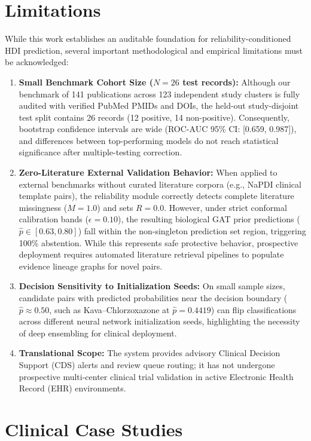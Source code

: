 \documentclass[10pt,journal,compsoc]{IEEEtran}
\begin{document}
\section{Limitations}
While this work establishes an auditable foundation for reliability-conditioned HDI prediction, several important methodological and empirical limitations must be acknowledged:
\begin{enumerate}
    \item \textbf{Small Benchmark Cohort Size ($N=26$ test records):} Although our benchmark of 141 publications across 123 independent study clusters is fully audited with verified PubMed PMIDs and DOIs, the held-out study-disjoint test split contains 26 records (12 positive, 14 non-positive). Consequently, bootstrap confidence intervals are wide (ROC-AUC 95\% CI: [0.659, 0.987]), and differences between top-performing models do not reach statistical significance after multiple-testing correction.
    \item \textbf{Zero-Literature External Validation Behavior:} When applied to external benchmarks without curated literature corpora (e.g., NaPDI clinical template pairs), the reliability module correctly detects complete literature missingness ($M = 1.0$) and sets $R = 0.0$. However, under strict conformal calibration bands ($\epsilon = 0.10$), the resulting biological GAT prior predictions ($\hat{p} \in [0.63, 0.80]$) fall within the non-singleton prediction set region, triggering 100\% abstention. While this represents safe protective behavior, prospective deployment requires automated literature retrieval pipelines to populate evidence lineage graphs for novel pairs.
    \item \textbf{Decision Sensitivity to Initialization Seeds:} On small sample sizes, candidate pairs with predicted probabilities near the decision boundary ($\hat{p} \approx 0.50$, such as Kava--Chlorzoxazone at $\hat{p} = 0.4419$) can flip classifications across different neural network initialization seeds, highlighting the necessity of deep ensembling for clinical deployment.
    \item \textbf{Translational Scope:} The system provides advisory Clinical Decision Support (CDS) alerts and review queue routing; it has not undergone prospective multi-center clinical trial validation in active Electronic Health Record (EHR) environments.
\end{enumerate}

\section{Clinical Case Studies}
\end{document}
